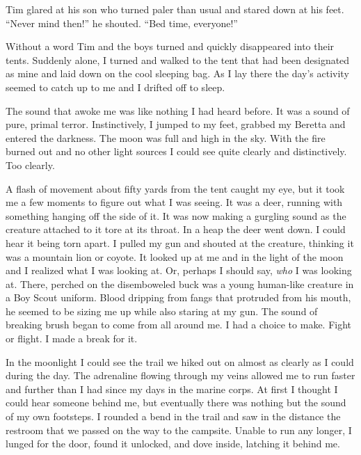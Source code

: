 Tim glared at his son who turned paler than usual and stared down
at his feet. ``Never mind then!'' he shouted. ``Bed time,
everyone!''



Without a word Tim and the boys turned and quickly disappeared into
their tents. Suddenly alone, I turned and walked to the tent that
had been designated as mine and laid down on the cool sleeping bag.
As I lay there the day's activity seemed to catch up to me and I
drifted off to sleep.



The sound that awoke me was like nothing I had heard before. It was
a sound of pure, primal terror. Instinctively, I jumped to my feet,
grabbed my Beretta and entered the darkness. The moon was full and
high in the sky. With the fire burned out and no other light
sources I could see quite clearly and distinctively. Too
clearly.



A flash of movement about fifty yards from the tent caught my eye,
but it took me a few moments to figure out what I was seeing. It
was a deer, running with something hanging off the side of it. It
was now making a gurgling sound as the creature attached to it tore
at its throat. In a heap the deer went down. I could hear it being
torn apart. I pulled my gun and shouted at the creature, thinking
it was a mountain lion or coyote. It looked up at me and in the
light of the moon and I realized what I was looking at. Or, perhaps
I should say, {\em who} I was looking at. There, perched on the
disemboweled buck was a young human-like creature in a Boy Scout
uniform. Blood dripping from fangs that protruded from his mouth,
he seemed to be sizing me up while also staring at my gun. The
sound of breaking brush began to come from all around me. I had a
choice to make. Fight or flight. I made a break for it.



In the moonlight I could see the trail we hiked out on almost as
clearly as I could during the day. The adrenaline flowing through
my veins allowed me to run faster and further than I had since my
days in the marine corps. At first I thought I could hear someone
behind me, but eventually there was nothing but the sound of my own
footsteps. I rounded a bend in the trail and saw in the distance
the restroom that we passed on the way to the campsite. Unable to
run any longer, I lunged for the door, found it unlocked, and dove
inside, latching it behind me.



